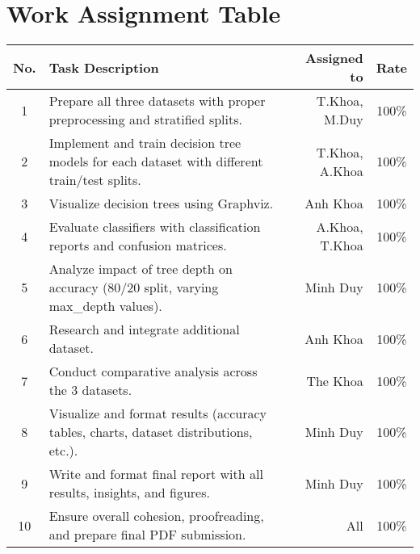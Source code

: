 \section{Work Assignment Table}
\begin{center}
  \renewcommand{\arraystretch}{1.5}
  \begin{tabular}{|c|p{}|r|c|}
    \hline
    \textbf{No.} & \textbf{Task Description}                                                                   & \textbf{Assigned to} & \textbf{Rate} \\\hline
    1            & Prepare all three datasets with proper preprocessing and stratified splits.                 & T.Khoa, M.Duy        & 100\%         \\\hline
    2            & Implement and train decision tree models for each dataset with different train/test splits. & T.Khoa, A.Khoa       & 100\%         \\\hline
    3            & Visualize decision trees using Graphviz.                                                    & Anh Khoa             & 100\%         \\\hline
    4            & Evaluate classifiers with classification reports and confusion matrices.                    & A.Khoa, T.Khoa       & 100\%         \\\hline
    5            & Analyze impact of tree depth on accuracy (80/20 split, varying max\_depth values).          & Minh Duy             & 100\%         \\\hline
    6            & Research and integrate additional dataset.                                                  & Anh Khoa             & 100\%         \\\hline
    7            & Conduct comparative analysis across the 3 datasets.                                         & The Khoa             & 100\%         \\\hline
    8            & Visualize and format results (accuracy tables, charts, dataset distributions, etc.).        & Minh Duy             & 100\%         \\\hline
    9            & Write and format final report with all results, insights, and figures.                      & Minh Duy             & 100\%         \\\hline
    10           & Ensure overall cohesion, proofreading, and prepare final PDF submission.                    & All                  & 100\%         \\\hline
  \end{tabular}
\end{center}
